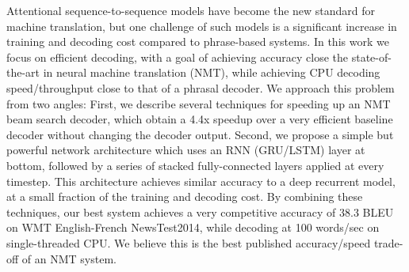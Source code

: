 Attentional sequence-to-sequence models have become the new standard for machine translation, but one challenge of such models is a significant increase in training and decoding cost compared to phrase-based systems. In this work we focus on efficient decoding, with a goal of achieving accuracy close the state-of-the-art in neural machine translation (NMT), while achieving CPU decoding speed/throughput close to that of a phrasal decoder. We approach this problem from two angles: First, we describe several techniques for speeding up an NMT beam search decoder, which obtain a 4.4x speedup over a very efficient baseline decoder without changing the decoder output. Second, we propose a simple but powerful network architecture which uses an RNN (GRU/LSTM) layer at bottom, followed by a series of stacked fully-connected layers applied at every timestep. This architecture achieves similar accuracy to a deep recurrent model, at a small fraction of the training and decoding cost. By combining these techniques, our best system achieves a very competitive accuracy of 38.3 BLEU on WMT English-French NewsTest2014, while decoding at 100 words/sec on single-threaded CPU. We believe this is the best published accuracy/speed trade-off of an NMT system.
